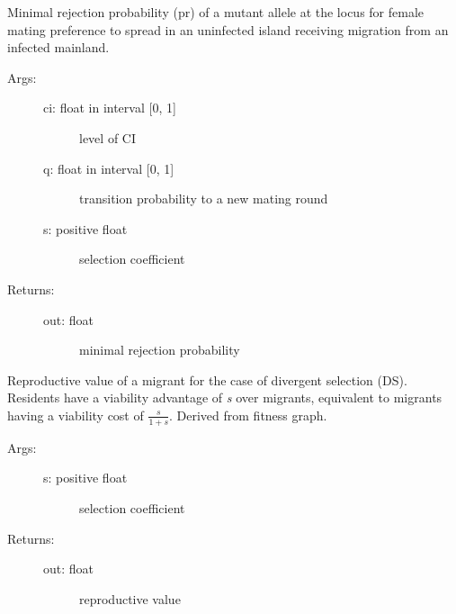\documentclass[letterpaper,10pt,english]{sphinxmanual}
\begin{document}
\begin{fulllineitems}
\label{index:wspec.analytical.prcrit}
Minimal rejection probability (pr) of a mutant allele at the locus 
for female mating preference to spread in an uninfected island 
receiving migration from an infected mainland.
\begin{description}
\item[{Args:}] \leavevmode\begin{description}
\item[{ci: float in interval {[}0, 1{]}}] \leavevmode
level of CI

\item[{q: float in interval {[}0, 1{]}}] \leavevmode
transition probability to a new mating round

\item[{s: positive float}] \leavevmode
selection coefficient

\end{description}

\item[{Returns:}] \leavevmode\begin{description}
\item[{out: float}] \leavevmode
minimal rejection probability

\end{description}

\end{description}

\end{fulllineitems}


\begin{fulllineitems}
\label{index:wspec.analytical.reproval_DS}
Reproductive value of a migrant for the case of divergent 
selection (DS). Residents have a viability advantage of \emph{s} over 
migrants, equivalent to migrants having a viability cost of 
$\frac{s}{1+s}$. Derived from fitness graph.
\begin{description}
\item[{Args:}] \leavevmode\begin{description}
\item[{s: positive float}] \leavevmode
selection coefficient

\end{description}

\item[{Returns:}] \leavevmode\begin{description}
\item[{out: float}] \leavevmode
reproductive value

\end{description}

\end{description}

\end{fulllineitems}
\end{document}
